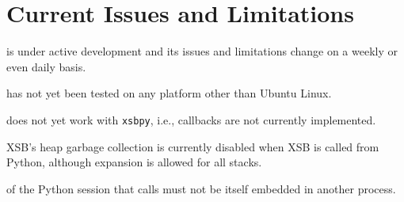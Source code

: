 \section{Current Issues and Limitations} \label{sec:px-limits}

\px{} is under active development and its issues and limitations
change on a weekly or even daily basis.

\bi
\item \px{} has not yet been tested on any platform other than Ubuntu
  Linux.
\item \px{} does not yet work with {\tt xsbpy}, i.e., callbacks are
  not currently implemented.
\item XSB's heap garbage collection is currently disabled when XSB is
  called from Python, although expansion is allowed for all stacks.
\item \pxversion{} of \px{} the Python session that calls \px{} must
  not be itself embedded in another process.
\ei  
  
 
